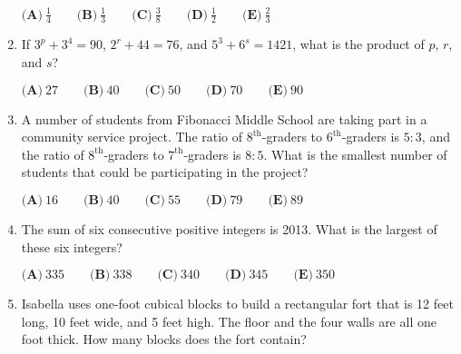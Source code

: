 \documentclass{article}
\begin{document}
\begin{enumerate}[label=\arabic*., itemsep=0.5em]
\(\textbf{(A)}\ \frac14 \qquad \textbf{(B)}\ \frac13 \qquad \textbf{(C)}\ \frac38 \qquad \textbf{(D)}\ \frac12 \qquad \textbf{(E)}\ \frac23\)\par \vspace{0.5em}\item If \(3^p + 3^4 = 90\), \(2^r + 44 = 76\), and \(5^3 + 6^s = 1421\), what is the product of \(p\), \(r\), and \(s\)?

\(\textbf{(A)}\ 27 \qquad \textbf{(B)}\ 40 \qquad \textbf{(C)}\ 50 \qquad \textbf{(D)}\ 70 \qquad \textbf{(E)}\ 90\)\par \vspace{0.5em}\item A number of students from Fibonacci Middle School are taking part in a community service project. The ratio of \(8^\text{th}\)-graders to \(6^\text{th}\)-graders is \(5:3\), and the ratio of \(8^\text{th}\)-graders to \(7^\text{th}\)-graders is \(8:5\). What is the smallest number of students that could be participating in the project?

\(\textbf{(A)}\ 16 \qquad \textbf{(B)}\ 40 \qquad \textbf{(C)}\ 55 \qquad \textbf{(D)}\ 79 \qquad \textbf{(E)}\ 89\)\par \vspace{0.5em}\item The sum of six consecutive positive integers is 2013. What is the largest of these six integers?

\(\textbf{(A)}\ 335 \qquad \textbf{(B)}\ 338 \qquad \textbf{(C)}\ 340 \qquad \textbf{(D)}\ 345 \qquad \textbf{(E)}\ 350\)\par \vspace{0.5em}\item Isabella uses one-foot cubical blocks to build a rectangular fort that is 12 feet long, 10 feet wide, and 5 feet high. The floor and the four walls are all one foot thick. How many blocks does the fort contain?



\end{enumerate}
\end{document}
